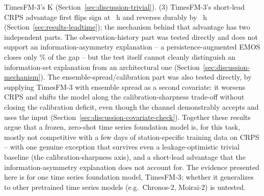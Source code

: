 TimesFM-3's \WidthTsfmFull{} K (Section~\ref{sec:discussion-trivial}).
(3) TimesFM-3's short-lead CRPS advantage first
flips sign at \FirstSignFlipHours{}~h and reverses durably by
\DurableCrossoverHours{}~h (Section~\ref{sec:results-leadtime}); the
mechanism behind that advantage has two independent parts. The
observation-history part was tested directly and does not support an
information-asymmetry explanation -- a persistence-augmented EMOS
closes only \PersistenceGapClosedPct{}\% of the gap -- but the test
itself cannot cleanly distinguish an information-set explanation from an
architectural one (Section~\ref{sec:discussion-mechanism}). The
ensemble-spread/calibration part was also tested directly, by supplying
TimesFM-3 with ensemble spread as a second covariate: it worsens CRPS
and shifts the model along the calibration-sharpness trade-off without
closing the calibration deficit, even though the channel demonstrably
accepts and uses the input (Section~\ref{sec:discussion-covariate-check}).
Together these results argue that a frozen, zero-shot time series
foundation model is, for this task, mostly not competitive with a few
days of station-specific training data on CRPS -- with one genuine
exception that survives even a leakage-optimistic trivial baseline (the
calibration-sharpness axis), and a short-lead advantage that the
information-asymmetry explanation does not account for. The evidence
presented here is for one
time series foundation model, TimesFM-3; whether it generalizes to other
pretrained time series models (e.g.\ Chronos-2, Moirai-2) is untested.
